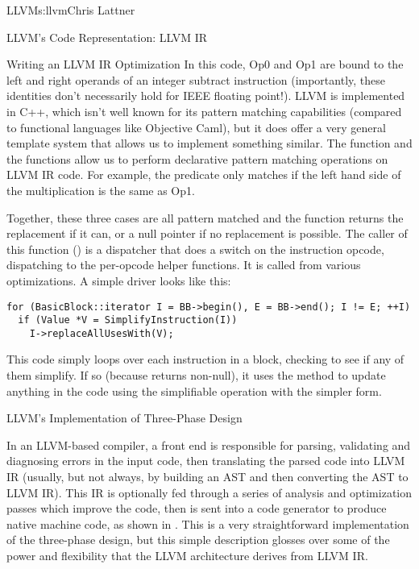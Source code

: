 \begin{aosachapter}{LLVM}{s:llvm}{Chris Lattner}
\begin{aosasect1}{LLVM's Code Representation: LLVM IR}
\begin{aosasect2}{Writing an LLVM IR Optimization}
\noindent In this code, Op0 and Op1 are bound to the left and right operands of
an integer subtract instruction (importantly, these identities don't
necessarily hold for IEEE floating point!).  LLVM is implemented in
C++, which isn't well known for its pattern matching capabilities
(compared to functional languages like Objective Caml), but it does
offer a very general template system that allows us to implement
something similar.  The  function and the 
functions allow us to perform declarative pattern matching operations
on LLVM IR code.  For example, the  predicate only
matches if the left hand side of the multiplication is the same as Op1.

Together, these three cases are all pattern matched and the function
returns the replacement if it can, or a null pointer if no replacement
is possible.  The caller of this function ()
is a dispatcher that does a switch on the instruction opcode,
dispatching to the per-opcode helper functions.  It is called from
various optimizations. A simple driver looks like this:

\begin{verbatim}
for (BasicBlock::iterator I = BB->begin(), E = BB->end(); I != E; ++I)
  if (Value *V = SimplifyInstruction(I))
    I->replaceAllUsesWith(V);
\end{verbatim}

\noindent This code simply loops over each instruction in a block, checking to
see if any of them simplify.  If so (because
 returns non-null), it uses the
 method to update anything in the code using
the simplifiable operation with the simpler form.

\end{aosasect2}

\end{aosasect1}

\begin{aosasect1}{LLVM's Implementation of Three-Phase Design}

In an LLVM-based compiler, a front end is responsible for parsing,
validating and diagnosing errors in the input code, then translating
the parsed code into LLVM IR (usually, but not always, by building an
AST and then converting the AST to LLVM IR).  This IR is optionally
fed through a series of analysis and optimization passes which improve
the code, then is sent into a code generator to produce native machine
code, as shown in . This is a very
straightforward implementation of the three-phase design, but this
simple description glosses over some of the power and flexibility
that the LLVM architecture derives from LLVM IR.


\end{aosasect1}
\end{aosachapter}
